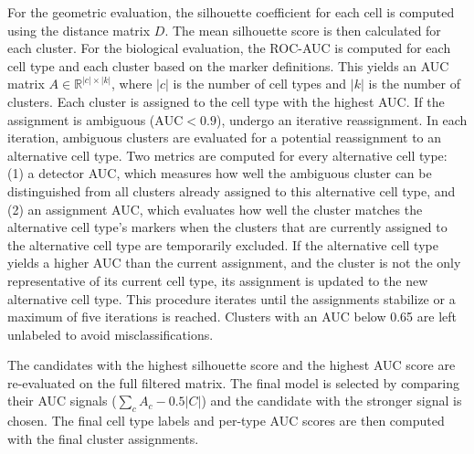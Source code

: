 \documentclass[11pt]{article}
\begin{document}
For the geometric evaluation, the silhouette coefficient for each cell is computed using the distance matrix $D$. The mean silhouette score is then calculated for each cluster.
For the biological evaluation, the ROC-AUC is computed for each cell type and each cluster based on the marker definitions. This yields an AUC matrix $A \in \mathbb{R}^{|c| \times |k|}$, where $|c|$ is the number of cell types and $|k|$ is the number of clusters. Each cluster is assigned to the cell type with the highest AUC. If the assignment is ambiguous ($\text{AUC}<0.9$), undergo an iterative reassignment.
In each iteration, ambiguous clusters are evaluated for a potential reassignment to an alternative cell type. Two metrics are computed for every alternative cell type: (1) a detector AUC, which measures how well the ambiguous cluster can be distinguished from all clusters already assigned to this alternative cell type, and (2) an assignment AUC, which evaluates how well the cluster matches the alternative cell type's markers when the clusters that are currently assigned to the alternative cell type are temporarily excluded.
If the alternative cell type yields a higher AUC than the current assignment, and the cluster is not the only representative of its current cell type, its assignment is updated to the new alternative cell type. This procedure iterates until the assignments stabilize or a maximum of five iterations is reached.
Clusters with an AUC below 0.65 are left unlabeled to avoid misclassifications.

The candidates with the highest silhouette score and the highest AUC score are re-evaluated on the full filtered matrix. The final model is selected by comparing their AUC signals ($\sum_{c} A_{c} - 0.5 |C|$) and the candidate with the stronger signal is chosen. The final cell type labels and per-type AUC scores are then computed with the final cluster assignments. %
\end{document}
